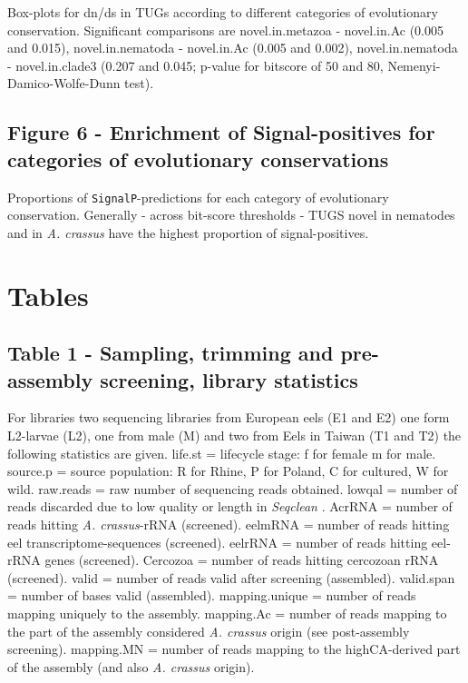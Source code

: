 \documentclass[10pt]{bmc_article}
\newenvironment{bmcformat}{\begin{raggedright}\baselineskip20pt\sloppy\setboolean{publ}{false}}{\end{raggedright}\baselineskip20pt\sloppy}
\begin{document}
\begin{bmcformat}
Box-plots for dn/ds in TUGs according to different categories of
evolutionary conservation. Significant comparisons are
novel.in.metazoa - novel.in.Ac (0.005 and 0.015), novel.in.nematoda -
novel.in.Ac (0.005 and 0.002), novel.in.nematoda - novel.in.clade3
(0.207 and 0.045; p-value for bitscore of 50 and 80,
Nemenyi-Damico-Wolfe-Dunn test).

\subsection*{Figure 6 - Enrichment of Signal-positives for categories
  of evolutionary conservations}

Proportions of \texttt{SignalP}-predictions for each category of
evolutionary conservation. Generally - across bit-score thresholds -
TUGS novel in nematodes and in \textit{A. crassus} have the highest
proportion of signal-positives.


\newpage

\section*{Tables}
\subsection*{Table 1 - Sampling, trimming and pre-assembly screening,
  library statistics}

For libraries two sequencing libraries from European eels (E1 and E2)
one form L2-larvae (L2), one from male (M) and two from Eels in Taiwan
(T1 and T2) the following statistics are given. life.st = lifecycle
stage: f for female m for male. source.p = source population: R for
Rhine, P for Poland, C for cultured, W for wild. raw.reads = raw
number of sequencing reads obtained. lowqal = number of reads
discarded due to low quality or length in \textit{Seqclean}
\cite{tgicl_pertea}. AcrRNA = number of reads hitting
\textit{A. crassus}-rRNA (screened). eelmRNA = number of reads hitting
eel transcriptome-sequences (screened). eelrRNA = number of reads
hitting eel-rRNA genes (screened). Cercozoa = number of reads hitting
cercozoan rRNA (screened). valid = number of reads valid after
screening (assembled). valid.span = number of bases valid (assembled).
mapping.unique = number of reads mapping uniquely to the
assembly. mapping.Ac = number of reads mapping to the part of the
assembly considered \textit{A. crassus} origin (see post-assembly
screening). mapping.MN = number of reads mapping to the highCA-derived
part of the assembly (and also \textit{A. crassus} origin).


\end{bmcformat}
\end{document}
